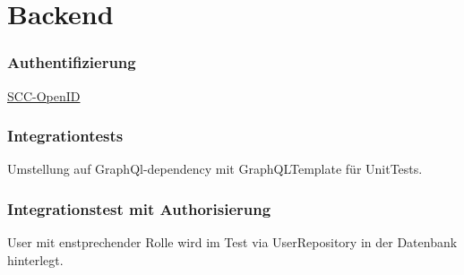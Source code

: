 \section{Backend}


    \begin{frame}\frametitle{Authentifizierung}
        \href{https://www.scc.kit.edu/dienste/openid-connect.php}{SCC-OpenID}
    \end{frame}

    \begin{frame}\frametitle{Integrationtests}
        Umstellung auf GraphQl-dependency mit GraphQLTemplate für UnitTests. 
    \end{frame}

    \begin{frame}\frametitle{Integrationstest mit Authorisierung}
        User mit enstprechender Rolle wird im Test via UserRepository in der Datenbank hinterlegt.
    \end{frame}

    \begin{frame}

    \end{frame}